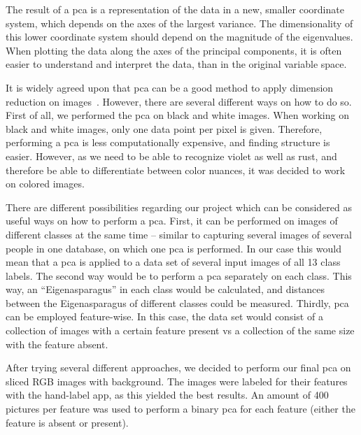 The result of a \acrshort{pca} is a representation of the data in a new, smaller coordinate system, which depends on the axes of the largest variance. The dimensionality of this lower coordinate system should depend on the magnitude of the eigenvalues. When plotting the data along the axes of the principal components, it is often easier to understand and interpret the data, than in the original variable space.

It is widely agreed upon that \acrshort{pca} can be a good method to apply dimension reduction on images~\citep{turk1991face,lata2009}.
However, there are several different ways on how to do so. First of all, we performed the \acrshort{pca} on black and white images. When working on black and white images, only one data point per pixel is given. Therefore, performing a \acrshort{pca} is less computationally expensive, and finding structure is easier. However, as we need to be able to recognize violet as well as rust, and therefore be able to differentiate between color nuances, it was decided to work on colored images.

\bigskip
There are different possibilities regarding our project which can be considered as useful ways on how to perform a \acrshort{pca}. First, it can be performed on images of different classes at the same time – similar to capturing several images of several people in one database, on which one \acrshort{pca} is performed. In our case this would mean that a \acrshort{pca} is applied to a data set of several input images of all 13 class labels. The second way would be to perform a \acrshort{pca} separately on each class. This way, an \enquote{Eigenasparagus} in each class would be calculated, and distances between the Eigenasparagus of different classes could be measured. Thirdly, \acrshort{pca} can be employed feature-wise. In this case, the data set would consist of a collection of images with a certain feature present vs a collection of the same size with the feature absent.

\bigskip
After trying several different approaches, we decided to perform our final \acrshort{pca} on sliced RGB images with background. The images were labeled for their features with the hand-label app, as this yielded the best results. An amount of 400 pictures per feature was used to perform a binary \acrshort{pca} for each feature (either the feature is absent or present).

